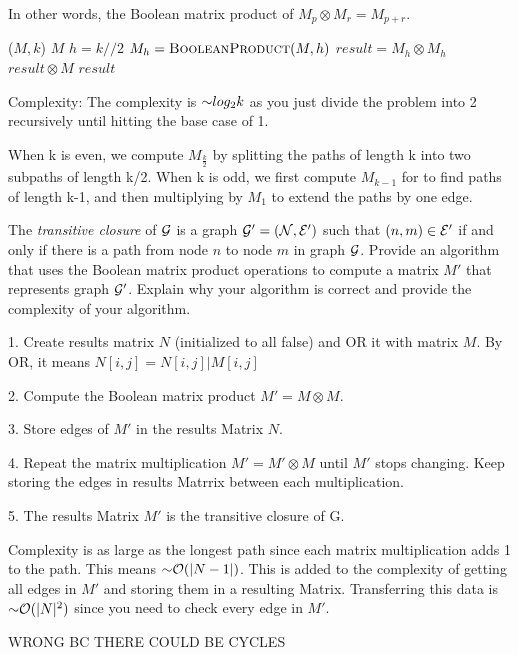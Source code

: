 \begin{problem}
\begin{questions}
In other words, the Boolean matrix product of $M_p \otimes M_r = M_{p+r}$.


\begin{myalgo}{($M, k$)}
    \RETURN $M$
  \ENDIF
  \STATE $h = k//2$
  \STATE $M_h = \textsc{BooleanProduct}(M, h)$
  \STATE $result = M_h \otimes M_h$ 
    \STATE $result \otimes M$ 
  \ENDIF
  \RETURN $result$
\end{myalgo}

Complexity: The complexity is $\mathord{\sim}log_2{k}$ as you just divide the problem into 2 recursively until hitting the base case of 1.

When k is even, we compute $M_{\frac{k}{2}}$ by splitting the paths of length k into two subpaths of length k/2. 
When k is odd, we first compute $M_{k-1}$ for to find paths of length k-1, and then multiplying by $M_1$ to extend the paths by one edge.


\item The \emph{transitive closure} of $\mathcal{G}$ is a graph $\mathcal{G}' = (\mathcal{N}, \mathcal{E}')$ such that $(n, m) \in \mathcal{E}'$ if and only if there is a path from node $n$ to node $m$ in graph $\mathcal{G}$. Provide an algorithm that uses the Boolean matrix product operations to compute a matrix $M'$ that represents graph $\mathcal{G}'$. Explain why your algorithm is correct and provide the complexity of your algorithm.

1. Create results matrix $N$ (initialized to all false) and OR it with matrix $M$. By OR, it means $N[i,j] = N[i,j] | M[i,j]$

2. Compute the Boolean matrix product $M' = M \otimes M$.

3. Store edges of $M'$ in the results Matrix $N$.

4. Repeat the matrix multiplication $M' = M' \otimes M$ until $M'$ stops changing. Keep storing the edges in results Matrrix between each multiplication.

5. The results Matrix $M'$ is the transitive closure of G.

Complexity is as large as the longest path since each matrix multiplication adds 1 to the path. This means $\mathord{\sim}\mathcal{O}(|N-1|)$. 
This is added to the complexity of getting all edges in $M'$ and storing them in a resulting Matrix. Transferring this data is $\mathord{\sim}\mathcal{O}(|N|^2)$ since you need to check every edge in $M'$.

WRONG BC THERE COULD BE CYCLES

\end{questions}
\end{problem}

